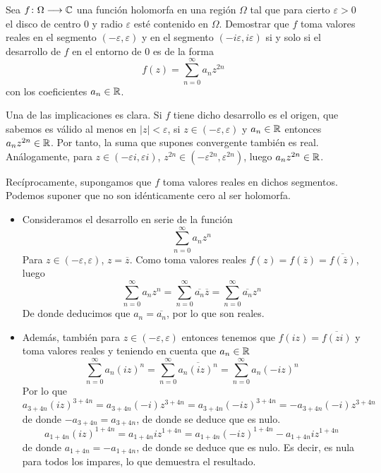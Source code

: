 \documentclass[twoside]{article}
\begin{document}
\begin{ejercicio}{6}
Sea $f\colon{\Omega}\longrightarrow{\mathbb{C}}$ una función holomorfa en una región $\Omega$ tal que para cierto $\varepsilon>0$ el disco de centro $0$ y radio $\varepsilon$ esté contenido en $\Omega$. Demostrar que $f$ toma valores reales en el segmento $(-\varepsilon,\varepsilon)$ y en el segmento $(-i\varepsilon,i\varepsilon)$ si y solo si el desarrollo de $f$ en el entorno de $0$ es de la forma
$$
f(z)=\sum_{n=0}^\infty a_nz^{2n}
$$
con los coeficientes $a_n \in \mathbb{R}$.
\end{ejercicio}
\begin{solucion}
Una de las implicaciones es clara. Si $f$ tiene dicho desarrollo es el origen, que sabemos es válido al menos en $|z|<\varepsilon$, si $z\in (-\varepsilon,\varepsilon)$ y $a_n\in \mathbb{R}$ entonces $a_nz^{2n} \in \mathbb{R}$. Por tanto, la suma que supones convergente también es real. Análogamente, para $z\in (-\varepsilon i,\varepsilon i)$, $z^{2n} \in (-\varepsilon^{2n},\varepsilon^{2n})$, luego $a_n z^{2n}\in \mathbb{R}$.

Recíprocamente, supongamos que $f$ toma valores reales en dichos segmentos. Podemos suponer que no son idénticamente cero al ser holomorfa. 
\begin{itemize}
\item Consideramos el desarrollo en serie de la función
$$\sum_{n=0}^\infty a_n z^n
$$
Para $z\in(-\varepsilon,\varepsilon)$, $z=\overline{z}$. Como toma valores reales $f(z)=f(\overline{z})=\overline{f(\overline{z})}$, luego
$$
\sum_{n=0}^\infty a_n z^n = \sum_{n=0}^\infty \overline{a_n} \overline{z} = \sum_{n=0}^\infty \overline{a_n}z^n
$$
De donde deducimos que $a_n=\overline{a_n}$, por lo que son reales.
\item Además, también para $z\in (-\varepsilon,\varepsilon)$ entonces tenemos que $f(iz) = \overline{f(zi)}$ y toma valores reales y teniendo en cuenta que $a_n \in \mathbb{R}$
$$
\sum_{n=0}^\infty a_n (iz)^n = \sum_{n=0}^\infty {\overline{a_n ({iz})^n}} = \sum_{n=0}^\infty {a_n ({-iz})^n}  
$$
Por lo que 
$$
a_{3+4n} (iz)^{3+4n} = a_{3+4n}(-i)z^{3+4n} = a_{3+4n}(-iz)^{3+4n} = -a_{3+4n}(-i)z^{3+4n}
$$
de donde $-a_{3+4n}=a_{3+4n}$, de donde se deduce que es nulo.
$$
a_{1+4n} (iz)^{1+4n} = a_{1+4n}iz^{1+4n} = a_{1+4n}(-iz)^{1+4n} -a_{1+4n}iz^{1+4n}
$$
de donde $a_{1+4n}=-a_{1+4n}$, de donde se deduce que es nulo.  Es decir, es nula para todos los impares, lo que demuestra el resultado.
\end{itemize}
\end{solucion}
\newpage
\end{document}
